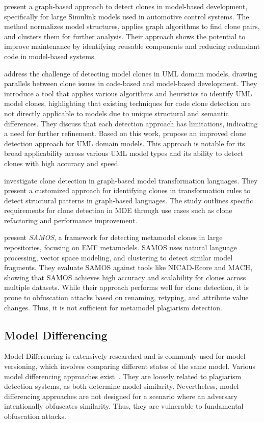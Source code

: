\citet{Deissenboeck2008} present a graph-based approach to detect clones in model-based development, specifically for large Simulink models used in automotive control systems. The method normalizes model structures, applies graph algorithms to find clone pairs, and clusters them for further analysis. Their approach shows the potential to improve maintenance by identifying reusable components and reducing redundant code in model-based systems.

\citet{Stoerrle2013} address the challenge of detecting model clones in UML domain models, drawing parallels between clone issues in code-based and model-based development. They introduce a tool that applies various algorithms and heuristics to identify UML model clones, highlighting that existing techniques for code clone detection are not directly applicable to models due to unique structural and semantic differences. They discuss that each detection approach has limitations, indicating a need for further refinement.
%
Based on this work, \citet{Stoerrle2015} propose an improved clone detection approach for UML domain models. This approach is notable for its broad applicability across various UML model types and its ability to detect clones with high accuracy and speed. 

\citet{Strueber2016} investigate clone detection in graph-based model transformation languages. They present a customized approach for identifying clones in transformation rules to detect structural patterns in graph-based languages. The study outlines specific requirements for clone detection in \ac{MDE} through use cases such as clone refactoring and performance improvement.

\citet{Babur2019} present \textit{SAMOS}, a framework for detecting metamodel clones in large repositories, focusing on EMF metamodels. SAMOS uses natural language processing, vector space modeling, and clustering to detect similar model fragments. They evaluate SAMOS against tools like NICAD-Ecore and MACH, showing that SAMOS achieves high accuracy and scalability for clones across multiple datasets. While their approach performs well for clone detection, it is prone to obfuscation attacks based on renaming, retyping, and attribute value changes. Thus, it is not sufficient for metamodel plagiarism detection.

\subsection{Model Differencing}
\noindent
Model Differencing is extensively researched \cite{Kessentini2014, Stephan2013} and is commonly used for model versioning, which involves comparing different states of the same model.
Various model differencing approaches exist~\cite{Kolovos2009, Zadahmad2019, Maoz2011}.
They are loosely related to plagiarism detection systems, as both determine model similarity.
Nevertheless, model differencing approaches are not designed for a scenario where an adversary intentionally obfuscates similarity. Thus, they are vulnerable to fundamental obfuscation attacks.

